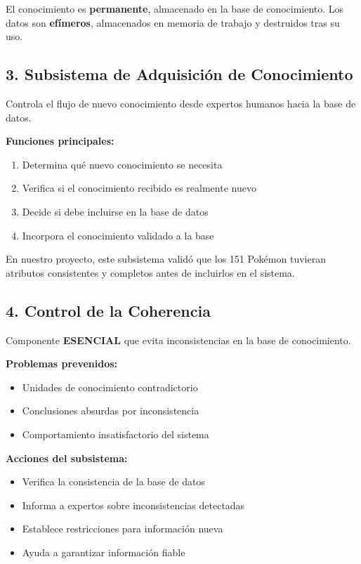 \documentclass[12pt,a4paper]{article}
\begin{document}
El conocimiento es \textbf{permanente}, almacenado en la base de conocimiento. Los datos son \textbf{efímeros}, almacenados en memoria de trabajo y destruidos tras su uso.

\subsection{3. Subsistema de Adquisición de Conocimiento}

Controla el flujo de nuevo conocimiento desde expertos humanos hacia la base de datos.

\textbf{Funciones principales:}
\begin{enumerate}
    \item Determina qué nuevo conocimiento se necesita
    \item Verifica si el conocimiento recibido es realmente nuevo
    \item Decide si debe incluirse en la base de datos
    \item Incorpora el conocimiento validado a la base
\end{enumerate}

En nuestro proyecto, este subsistema validó que los 151 Pokémon tuvieran atributos consistentes y completos antes de incluirlos en el sistema.

\subsection{4. Control de la Coherencia}

Componente \textbf{ESENCIAL} que evita inconsistencias en la base de conocimiento.

\textbf{Problemas prevenidos:}
\begin{itemize}
    \item Unidades de conocimiento contradictorio
    \item Conclusiones absurdas por inconsistencia
    \item Comportamiento insatisfactorio del sistema
\end{itemize}

\textbf{Acciones del subsistema:}
\begin{itemize}
    \item Verifica la consistencia de la base de datos
    \item Informa a expertos sobre inconsistencias detectadas
    \item Establece restricciones para información nueva
    \item Ayuda a garantizar información fiable
\end{itemize}
\end{document}

